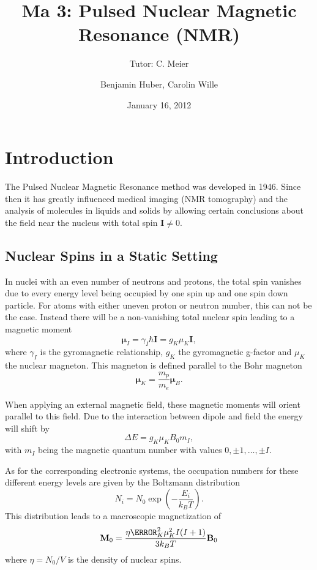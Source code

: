 \documentclass[a4paper]{scrartcl}
\title{Ma 3: Pulsed Nuclear Magnetic Resonance (NMR)}
\subtitle{Tutor: C. Meier}
\author{Benjamin Huber, Carolin Wille}
\date{January 16, 2012}
\numberwithin{equation}{section}
\numberwithin{figure}{section}
\numberwithin{table}{section}
\newcommand{\eq}[2]{\begin{equation}#1\label{#2}\end{equation}}
\newcommand{\ve}[1]{\mathbf{ #1} }
\begin{document}
\thispagestyle{empty}
\maketitle
\tableofcontents
\clearpage


\section{Introduction}
The Pulsed Nuclear Magnetic Resonance method was developed in 1946. Since then it has greatly influenced medical imaging (NMR tomography) and the analysis of molecules in liquids and solids by allowing certain conclusions about the field near the nucleus with total spin $\ve I \neq 0$.


\subsection{Nuclear Spins in a Static Setting}
In nuclei with an even number of neutrons and protons, the total spin vanishes due to every energy level being occupied by one spin up and one spin down particle. For atoms with either uneven proton or neutron number, this can not be the case. Instead there will be a non-vanishing total nuclear spin leading to a magnetic moment
\eq{\ve \mu_I = \gamma_I \hbar \ve I =g_K \mu_K \ve I,}{}
where $\gamma_I$ is the gyromagnetic relationship, $g_K$ the gyromagnetic g-factor and $\mu_K$ the nuclear magneton. This magneton is defined parallel to the Bohr magneton
\eq{\ve \mu_K = \frac{m_p}{m_e}\ve \mu_B .}{}

When applying an external magnetic field, these magnetic moments will orient parallel to this field. Due to the interaction between dipole and field the energy will shift by
\eq{\Delta E = g_K\mu_K B_0 m_I ,}{}
with $m_I$ being the magnetic quantum number with values $0,\pm 1,\dots,\pm I$.

As for the corresponding electronic systems, the occupation numbers for these different energy levels are given by the Boltzmann distribution
\eq{N_i = N_0 \exp\left( -\frac{E_i}{k_B T} \right) .}{}
This distribution leads to a macroscopic magnetization of
\eq{\ve M_0 = \frac{\eta \g_K^2 \mu_K^2 I(I+1)}{3 k_B T} \ve B_0}{}
where $\eta = N_0/V$ is the density of nuclear spins.
\end{document}
